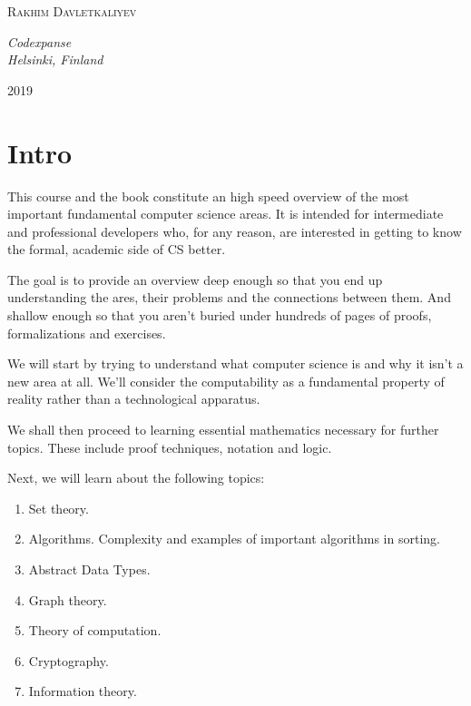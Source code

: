 \documentclass[12pt, a4paper, justified, notitlepage, sfsidenotes, notoc]{book}
\begin{document}
\begin{titlepage}
\begin{fullwidth}
	{\scshape\Large Rakhim Davletkaliyev \\} %

	\vspace{0.5\baselineskip} %

	\textit{Codexpanse\\ Helsinki, Finland} %

	\vfill %




	2019 %


\end{fullwidth}
\end{titlepage}

\setcounter{tocdepth}{4}
\tableofcontents

\part{Intro}
\label{sec:orgb72465b}

This course and the book constitute an high speed overview of the most important fundamental computer science areas. It is intended for intermediate and professional developers who, for any reason, are interested in getting to know the formal, academic side of CS better.

The goal is to provide an overview deep enough so that you end up understanding the ares, their problems and the connections between them. And shallow enough so that you aren't buried under hundreds of pages of proofs, formalizations and exercises.

We will start by trying to understand what computer science is and why it isn't a new area at all. We'll consider the computability as a fundamental property of reality rather than a technological apparatus.

We shall then proceed to learning essential mathematics necessary for further topics. These include proof techniques, notation and logic.

Next, we will learn about the following topics:

\begin{enumerate}
\item Set theory.
\item Algorithms. Complexity and examples of important algorithms in sorting.
\item Abstract Data Types.
\item Graph theory.
\item Theory of computation.
\item Cryptography.
\item Information theory.
\end{enumerate}
\end{document}

